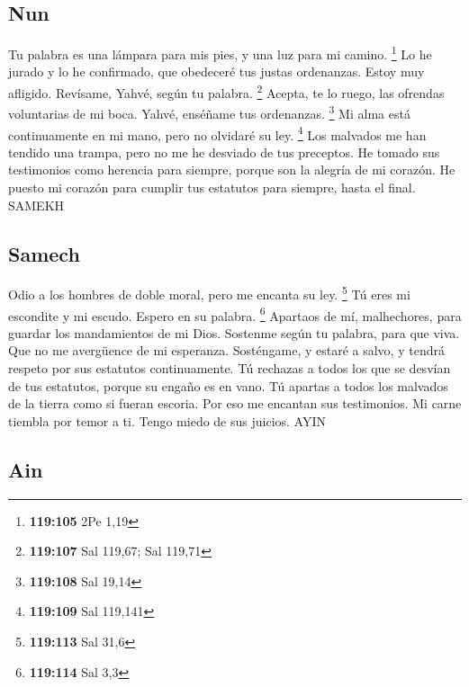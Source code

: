 \begin{paracol}{2}
\hypertarget{nun}{%
\subsection{Nun}\label{nun}}

 Tu palabra es una lámpara para mis pies, y una luz para
mi camino. \footnote{\textbf{119:105} 2Pe 1,19}  Lo he
jurado y lo he confirmado, que obedeceré tus justas ordenanzas.
 Estoy muy afligido. Revísame, Yahvé, según tu palabra.
\footnote{\textbf{119:107} Sal 119,67; Sal 119,71} 
Acepta, te lo ruego, las ofrendas voluntarias de mi boca. Yahvé,
enséñame tus ordenanzas. \footnote{\textbf{119:108} Sal 19,14}
 Mi alma está continuamente en mi mano, pero no olvidaré
su ley. \footnote{\textbf{119:109} Sal 119,141}  Los
malvados me han tendido una trampa, pero no me he desviado de tus
preceptos.  He tomado sus testimonios como herencia para
siempre, porque son la alegría de mi corazón.  He puesto
mi corazón para cumplir tus estatutos para siempre, hasta el final.
SAMEKH

\hypertarget{samech}{%
\subsection{Samech}\label{samech}}

 Odio a los hombres de doble moral, pero me encanta su
ley. \footnote{\textbf{119:113} Sal 31,6}  Tú eres mi
escondite y mi escudo. Espero en su palabra. \footnote{\textbf{119:114}
  Sal 3,3}  Apartaos de mí, malhechores, para guardar
los mandamientos de mi Dios.  Sostenme según tu palabra,
para que viva. Que no me avergüence de mi esperanza. 
Sosténgame, y estaré a salvo, y tendrá respeto por sus estatutos
continuamente.  Tú rechazas a todos los que se desvían
de tus estatutos, porque su engaño es en vano.  Tú
apartas a todos los malvados de la tierra como si fueran escoria. Por
eso me encantan sus testimonios.  Mi carne tiembla por
temor a ti. Tengo miedo de sus juicios. AYIN

\hypertarget{ain}{%
\subsection{Ain}\label{ain}}


\end{paracol}
